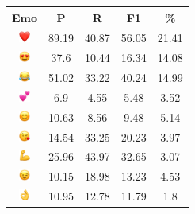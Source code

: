 \documentclass{article}
\begin{document}
\begin{table}
\centering
\begin{tabular}{|c|ccc|c|} \hline
\textbf{Emo} & \textbf{P} & \textbf{R} & \textbf{F1} & \textbf{\%} \\ \hline
\includegraphics[height=0.37cm,width=0.37cm]{img/red_heart.png} & 89.19 & 40.87 & 56.05 & 21.41\\ 
\includegraphics[height=0.37cm,width=0.37cm]{img/smiling_face_with_hearteyes.png} & 37.6 & 10.44 & 16.34 & 14.08\\ 
\includegraphics[height=0.37cm,width=0.37cm]{img/face_with_tears_of_joy.png} & 51.02 & 33.22 & 40.24 & 14.99\\ 
\includegraphics[height=0.37cm,width=0.37cm]{img/two_hearts.png} & 6.9 & 4.55 & 5.48 & 3.52\\ 
\includegraphics[height=0.37cm,width=0.37cm]{img/smiling_face_with_smiling_eyes.png} & 10.63 & 8.56 & 9.48 & 5.14\\ 
\includegraphics[height=0.37cm,width=0.37cm]{img/face_blowing_a_kiss.png} & 14.54 & 33.25 & 20.23 & 3.97\\ 
\includegraphics[height=0.37cm,width=0.37cm]{img/flexed_biceps.png} & 25.96 & 43.97 & 32.65 & 3.07\\ 
\includegraphics[height=0.37cm,width=0.37cm]{img/winking_face.png} & 10.15 & 18.98 & 13.23 & 4.53\\ 
\includegraphics[height=0.37cm,width=0.37cm]{img/OK_hand.png} & 10.95 & 12.78 & 11.79 & 1.8\\ 

\end{tabular}
\end{table}
\end{document}
